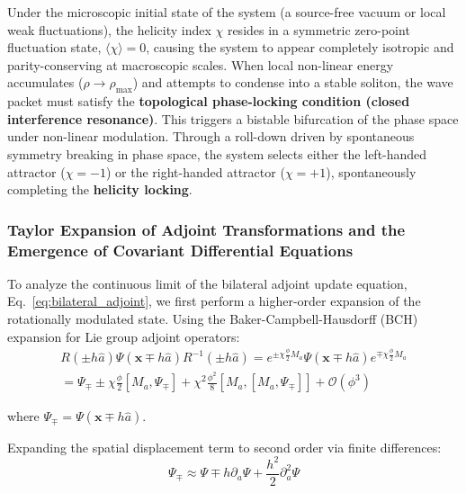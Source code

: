 \documentclass[12pt, a4paper]{article}
\begin{document}
Under the microscopic initial state of the system (a source-free vacuum or local weak fluctuations), the helicity index $\chi$ resides in a symmetric zero-point fluctuation state, $\langle \chi \rangle = 0$, causing the system to appear completely isotropic and parity-conserving at macroscopic scales. When local non-linear energy accumulates ($\rho \to \rho_{\text{max}}$) and attempts to condense into a stable soliton, the wave packet must satisfy the \textbf{topological phase-locking condition (closed interference resonance)}. This triggers a bistable bifurcation of the phase space under non-linear modulation. Through a roll-down driven by spontaneous symmetry breaking in phase space, the system selects either the left-handed attractor ($\chi = -1$) or the right-handed attractor ($\chi = +1$), spontaneously completing the \textbf{helicity locking}.

\subsubsection{Taylor Expansion of Adjoint Transformations and the Emergence of Covariant Differential Equations}

To analyze the continuous limit of the bilateral adjoint update equation, Eq.~\eqref{eq:bilateral_adjoint}, we first perform a higher-order expansion of the rotationally modulated state. Using the Baker-Campbell-Hausdorff (BCH) expansion for Lie group adjoint operators:
\begin{equation}
\label{eq:bch_expansion}
\begin{split}
R(\pm h \hat{a}) \Psi(\mathbf{x} \mp h \hat{a}) R^{-1}(\pm h \hat{a}) = e^{\pm \chi \frac{\phi}{2} M_a} \Psi(\mathbf{x} \mp h \hat{a}) e^{\mp \chi \frac{\phi}{2} M_a} \\
= \Psi_\mp \pm \chi \frac{\phi}{2} [M_a, \Psi_\mp] + \chi^2 \frac{\phi^2}{8} [M_a, [M_a, \Psi_\mp]] + \mathcal{O}(\phi^3)
\end{split}
\end{equation}

where $\Psi_\mp = \Psi(\mathbf{x} \mp h\hat{a})$.

Expanding the spatial displacement term to second order via finite differences:
\begin{equation}
\label{eq:spatial_diff}
\Psi_\mp \approx \Psi \mp h \partial_a \Psi + \frac{h^2}{2} \partial_a^2 \Psi
\end{equation}
\end{document}
